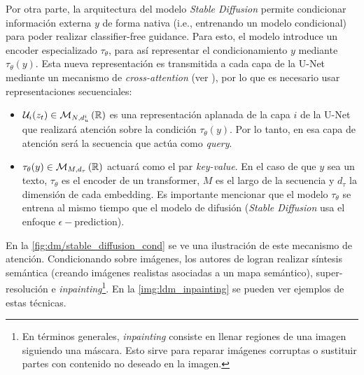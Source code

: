 Por otra parte, la arquitectura del modelo \textit{Stable Diffusion} permite condicionar información externa $y$ de forma nativa (i.e., entrenando un modelo condicional) para poder realizar classifier-free guidance. Para esto, el modelo introduce un encoder especializado $\tau_\theta$, para así representar el condicionamiento $y$ mediante $\tau_\theta(y)$. Esta nueva representación es transmitida a cada capa de la U-Net mediante un mecanismo de \textit{cross-attention} (ver \cite{vaswani2023attention}), por lo que es necesario usar representaciones secuenciales:

\begin{itemize}
    \item $\mathcal{U}_i(z_t)\in\mathcal{M}_{N,d_u^i}\left(\mathbb{R}\right)$ es una representación aplanada de la capa $i$ de la U-Net que realizará atención sobre la condición $\tau_\theta(y)$. Por lo tanto, en esa capa de atención será la secuencia que actúa como \textit{query}.
    \item $\tau_\theta(y)\in\mathcal{M}_{M,d_\tau}\left(\mathbb{R}\right)$ actuará como el par \textit{key-value}. En el caso de que $y$ sea un texto, $\tau_\theta$ es el encoder de un transformer, $M$ es el largo de la secuencia y $d_\tau$ la dimensión de cada embedding. Es importante mencionar que el modelo $\tau_\theta$ se entrena al mismo tiempo que el modelo de difusión (\textit{Stable Diffusion} usa el enfoque $\epsilon-$prediction).
\end{itemize}

En la \autoref{fig:dm/stable_diffusion_cond} se ve una ilustración de este mecanismo de atención. Condicionando sobre imágenes, los autores de \cite{rombach2022highresolution} logran realizar síntesis semántica (creando imágenes realistas asociadas a un mapa semántico), super-resolución  e \textit{inpainting}\footnote{En términos generales, \textit{inpainting} consiste en llenar regiones de una imagen siguiendo una máscara. Esto sirve para reparar imágenes corruptas o sustituir partes con contenido no deseado en la imagen.}. En la \autoref{img:ldm_inpainting} se pueden ver ejemplos de estas técnicas.


